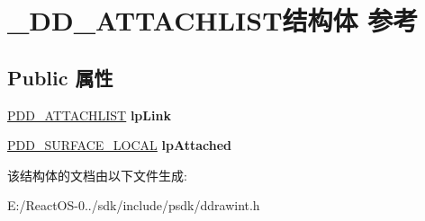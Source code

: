\hypertarget{struct___d_d___a_t_t_a_c_h_l_i_s_t}{}\section{\+\_\+\+D\+D\+\_\+\+A\+T\+T\+A\+C\+H\+L\+I\+S\+T结构体 参考}
\label{struct___d_d___a_t_t_a_c_h_l_i_s_t}
\subsection*{Public 属性}
\begin{DoxyCompactItemize}
\item 
\mbox{\label{struct___d_d___a_t_t_a_c_h_l_i_s_t_aa081c1ede65f77e51064cd5ef8e8f554}} 
\hyperlink{struct___d_d___a_t_t_a_c_h_l_i_s_t}{P\+D\+D\+\_\+\+A\+T\+T\+A\+C\+H\+L\+I\+ST} {\bfseries lp\+Link}
\item 
\mbox{\label{struct___d_d___a_t_t_a_c_h_l_i_s_t_ab7947d75532c85906bec8ae0c7cbb9c1}} 
\hyperlink{struct___d_d___s_u_r_f_a_c_e___l_o_c_a_l}{P\+D\+D\+\_\+\+S\+U\+R\+F\+A\+C\+E\+\_\+\+L\+O\+C\+AL} {\bfseries lp\+Attached}
\end{DoxyCompactItemize}


该结构体的文档由以下文件生成\+:\begin{DoxyCompactItemize}
\item 
E\+:/\+React\+O\+S-\/0../sdk/include/psdk/ddrawint.\+h\end{DoxyCompactItemize}
